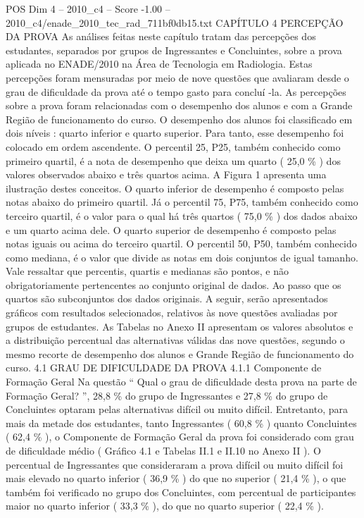 \begin{textsample}{POS Dim 4 – 2010\_c4 – Score -1.00 – 2010\_c4/enade\_2010\_tec\_rad\_711bf0db15.txt}  \label{ex:f4_pos_295}
CAPÍTULO 4 PERCEPÇÃO DA PROVA As análises feitas neste capítulo tratam das percepções dos estudantes, separados por grupos de Ingressantes e Concluintes, sobre a prova aplicada no ENADE/2010 na Área de Tecnologia em Radiologia.
Estas percepções foram mensuradas por meio de nove questões que avaliaram desde o grau de dificuldade da prova até o tempo gasto para concluí -la.
As percepções sobre a prova foram relacionadas com o desempenho dos alunos e com a Grande Região de funcionamento do curso.
O desempenho dos alunos foi classificado em dois níveis : quarto inferior e quarto superior.
Para tanto, esse desempenho foi colocado em ordem ascendente.
O percentil 25, P25, também conhecido como primeiro quartil, é a nota de desempenho que deixa um quarto ( 25,0 \% ) dos valores observados abaixo e três quartos acima.
A Figura 1 apresenta uma ilustração destes conceitos.
O quarto inferior de desempenho é composto pelas notas abaixo do primeiro quartil.
Já o percentil 75, P75, também conhecido como terceiro quartil, é o valor para o qual há três quartos ( 75,0 \% ) dos dados abaixo e um quarto acima dele.
O quarto superior de desempenho é composto pelas notas iguais ou acima do terceiro quartil.
O percentil 50, P50, também conhecido como mediana, é o valor que divide as notas em dois conjuntos de igual tamanho.
Vale ressaltar que percentis, quartis e medianas são pontos, e não obrigatoriamente pertencentes ao conjunto original de dados.
Ao passo que os quartos são subconjuntos dos dados originais.
A seguir, serão apresentados gráficos com resultados selecionados, relativos às nove questões avaliadas por grupos de estudantes.
As Tabelas no Anexo II apresentam os valores absolutos e a distribuição percentual das alternativas válidas das nove questões, segundo o mesmo recorte de desempenho dos alunos e Grande Região de funcionamento do curso. 4.1 GRAU DE DIFICULDADE DA PROVA 4.1.1 Componente de Formação Geral Na questão “ Qual o grau de dificuldade desta prova na parte de Formação Geral? ”, 28,8 \% do grupo de Ingressantes e 27,8 \% do grupo de Concluintes optaram pelas alternativas difícil ou muito difícil.
Entretanto, para mais da metade dos estudantes, tanto Ingressantes ( 60,8 \% ) quanto Concluintes ( 62,4 \% ), o Componente de Formação Geral da prova foi considerado com grau de dificuldade médio ( Gráfico 4.1 e Tabelas II.1 e II.10 no Anexo II ).
O percentual de Ingressantes que consideraram a prova difícil ou muito difícil foi mais elevado no quarto inferior ( 36,9 \% ) do que no superior ( 21,4 \% ), o que também foi verificado no grupo dos Concluintes, com percentual de participantes maior no quarto inferior ( 33,3 \% ), do que no quarto superior ( 22,4 \% ).

\end{textsample}
